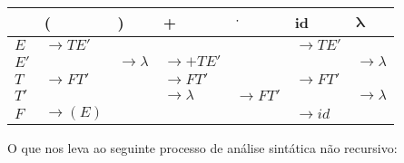 {    \begin{table}[htbp]
        \centering
        \begin{tabularx}{\linewidth}{ | l | >{\RaggedRight\arraybackslash}X |
                        >{\RaggedRight\arraybackslash}X | >{\RaggedRight\arraybackslash}X |
                        >{\RaggedRight\arraybackslash}X |
                    >{\RaggedRight\arraybackslash}X |
                >{\RaggedRight\arraybackslash}X |}
            \hline
                 & \textbf{(}          & \textbf{)}          & \textbf{+}          &
            $\mathbf \cdot$
            	 & \textbf{id} & $\mathbf \lambda$ \\
            \hline
           		$E$ & $\to TE'$ & & & & $ \to TE'$ & \\
           	\hline
           		$E'$ & & $\to \lambda$ & $\to +TE'$ & & & $\to
           		\lambda$ \\
           	\hline
           		$T$ & $\to FT'$ & & $\to FT'$ & & $\to FT'$ & \\
           	\hline
           		$T'$ & & & $\to \lambda$ & $\to FT'$ & & $\to \lambda$ \\
           	\hline
           		$F$ & $\to (E)$ & & & & $\to id$ & \\
           	\hline
        \end{tabularx}
    \end{table}

    O que nos leva ao seguinte processo de análise sintática não recursivo:

}
